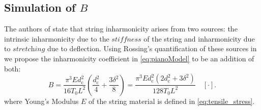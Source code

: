 \documentclass{article}
\begin{document}
\begin{sloppy}
\subsection{Simulation of $B$}\label{sec:Bsimulation}
The authors of \cite{coltShank} state that string inharmonicity arises from two sources: the intrinsic inharmonicity due to the $\textit{stiffness}$ of the string and inharmonicity due to $\textit{stretching}$ due to deflection. Using Rossing's quantification of these sources in \cite{rossing:science_of_string_instruments} we propose the inharmonicity coefficient in \eqref{eq:pianoModel} to be an addition of both:
\begin{equation}\label{eq:totalInharmonicity}
    B =  \frac {\pi^3 E d_\text{c}^2}{16 T_0 L^2}\left(\frac {d_\text{c}^2}{4}   +  \frac {3\delta^2}{8} \right)  =  \frac{\pi^3 E d_\text{c}^2(2d_\text{c}^2 + 3\delta^2)}{128 T_0 L^2}\quad [\cdot].
\end{equation}
where Young's Modulus $E$ of the string material is defined in \eqref{eq:tensile_stress}.
%
%

\end{sloppy}
\end{document}
